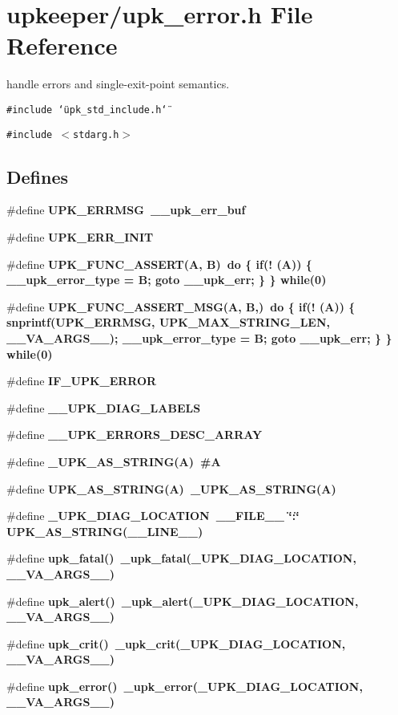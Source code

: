 \section{upkeeper/upk\_\-error.h File Reference}
\label{upk__error_8h}
handle errors and single-exit-point semantics. 

{\tt \#include \char`\"{}upk\_\-std\_\-include.h\char`\"{}}\par
{\tt \#include $<$stdarg.h$>$}\par
\subsection*{Defines}
\begin{CompactItemize}
\item 
\#define \bf{UPK\_\-ERRMSG}~\_\-\_\-upk\_\-err\_\-buf
\item 
\#define \bf{UPK\_\-ERR\_\-INIT}
\item 
\#define \bf{UPK\_\-FUNC\_\-ASSERT}(A, B)~do \{ if(! (A)) \{ \_\-\_\-upk\_\-error\_\-type = B; goto \_\-\_\-upk\_\-err; \} \} while(0)
\item 
\#define \bf{UPK\_\-FUNC\_\-ASSERT\_\-MSG}(A, B,)~do \{ if(! (A)) \{ snprintf(UPK\_\-ERRMSG, UPK\_\-MAX\_\-STRING\_\-LEN, \_\-\_\-VA\_\-ARGS\_\-\_\-); \_\-\_\-upk\_\-error\_\-type = B; goto \_\-\_\-upk\_\-err; \} \} while(0)
\item 
\#define \bf{IF\_\-UPK\_\-ERROR}
\item 
\#define \bf{\_\-\_\-UPK\_\-DIAG\_\-LABELS}
\item 
\#define \bf{\_\-\_\-UPK\_\-ERRORS\_\-DESC\_\-ARRAY}
\item 
\#define \bf{\_\-UPK\_\-AS\_\-STRING}(A)~\#A
\item 
\#define \bf{UPK\_\-AS\_\-STRING}(A)~\_\-UPK\_\-AS\_\-STRING(A)
\item 
\#define \bf{\_\-UPK\_\-DIAG\_\-LOCATION}~\_\-\_\-FILE\_\-\_\- \char`\"{}:\char`\"{} UPK\_\-AS\_\-STRING(\_\-\_\-LINE\_\-\_\-)
\item 
\#define \bf{upk\_\-fatal}()~\_\-upk\_\-fatal(\_\-UPK\_\-DIAG\_\-LOCATION, \_\-\_\-VA\_\-ARGS\_\-\_\-)
\item 
\#define \bf{upk\_\-alert}()~\_\-upk\_\-alert(\_\-UPK\_\-DIAG\_\-LOCATION, \_\-\_\-VA\_\-ARGS\_\-\_\-)
\item 
\#define \bf{upk\_\-crit}()~\_\-upk\_\-crit(\_\-UPK\_\-DIAG\_\-LOCATION, \_\-\_\-VA\_\-ARGS\_\-\_\-)
\item 
\#define \bf{upk\_\-error}()~\_\-upk\_\-error(\_\-UPK\_\-DIAG\_\-LOCATION, \_\-\_\-VA\_\-ARGS\_\-\_\-)

\end{CompactItemize}

